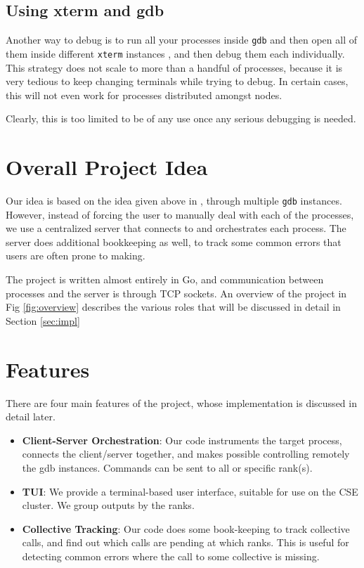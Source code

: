 \documentclass[10pt,conference]{IEEEtran}
\begin{document}
\subsection{Using xterm and gdb}

Another way to debug is to run all your processes inside \texttt{gdb} and then open all of them inside different \texttt{xterm} instances \cite{openmpidebug}, and then debug them each individually. This strategy does not scale to more than a handful of processes, because it is very tedious to keep changing terminals while trying to debug. In certain cases, this will not even work for processes distributed amongst nodes.

Clearly, this is too limited to be of any use once any serious debugging is needed.

\section{Overall Project Idea}

Our idea is based on the idea given above in \cite{openmpidebug}, through multiple \texttt{gdb} instances. However, instead of forcing the user to manually deal with each of the processes, we use a centralized server that connects to and orchestrates each process. The server does additional bookkeeping as well, to track some common errors that users are often prone to making.

The project is written almost entirely in Go, and communication between processes and the server is through TCP sockets. An overview of the project in Fig \ref{fig:overview} describes the various roles that will be discussed in detail in Section \ref{sec:impl}



\section{Features}

There are four main features of the project, whose implementation is discussed in detail later.

\begin{itemize}
\item \textbf{Client-Server Orchestration}: Our code instruments the target process, connects the client/server together, and makes possible controlling remotely the gdb instances. Commands can be sent to all or specific rank(s).
\item \textbf{TUI}: We provide a terminal-based user interface, suitable for use on the CSE cluster. We group outputs by the ranks.
\item \textbf{Collective Tracking}: Our code does some book-keeping to track collective calls, and find out which calls are pending at which ranks. This is useful for detecting common errors where the call to some collective is missing.
\end{itemize}
\end{document}
